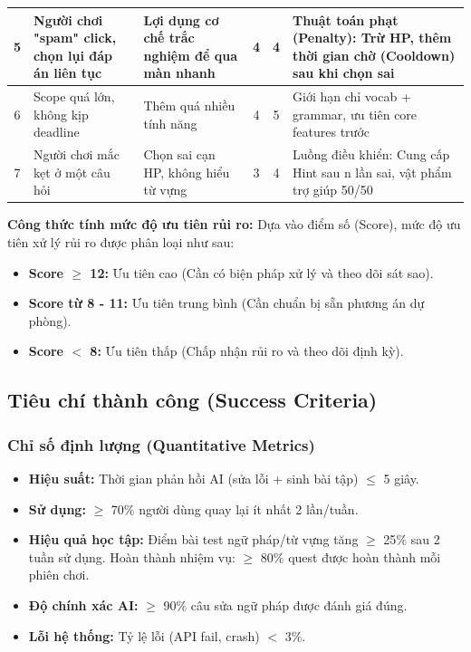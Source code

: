 \begin{xltabular}{\textwidth}{|S|P|P|C|C|P|}
    5 & Người chơi "spam" click, chọn lụi đáp án liên tục & Lợi dụng cơ chế trắc nghiệm để qua màn nhanh & 4 & 4 & Thuật toán phạt (Penalty): Trừ HP, thêm thời gian chờ (Cooldown) sau khi chọn sai \\ \hline
    
    6 & Scope quá lớn, không kịp deadline & Thêm quá nhiều tính năng & 4 & 5 & Giới hạn chỉ vocab + grammar, ưu tiên core features trước \\ \hline
    
    7 & Người chơi mắc kẹt ở một câu hỏi & Chọn sai cạn HP, không hiểu từ vựng & 3 & 4 & Luồng điều khiển: Cung cấp Hint sau n lần sai, vật phẩm trợ giúp 50/50 \\ \hline
    
\end{xltabular}
\textbf{Công thức tính mức độ ưu tiên rủi ro:}
Dựa vào điểm số (Score), mức độ ưu tiên xử lý rủi ro được phân loại như sau:
\begin{itemize}[label=$\bullet$]
    \item \textbf{Score $\geq$ 12:} Ưu tiên cao (Cần có biện pháp xử lý và theo dõi sát sao).
    \item \textbf{Score từ 8 - 11:} Ưu tiên trung bình (Cần chuẩn bị sẵn phương án dự phòng).
    \item \textbf{Score $<$ 8:} Ưu tiên thấp (Chấp nhận rủi ro và theo dõi định kỳ).
\end{itemize}
\subsection{Tiêu chí thành công (Success Criteria)}
\subsubsection{Chỉ số định lượng (Quantitative Metrics)}
\begin{itemize}[label=-]
\item \textbf{Hiệu suất:} Thời gian phản hồi AI (sửa lỗi + sinh bài tập) $\leq$ 5 giây.
\item \textbf{Sử dụng:} $\geq$ 70$\%$ người dùng quay lại ít nhất 2 lần/tuần.
\item \textbf{Hiệu quả học tập:} Điểm bài test ngữ pháp/từ vựng tăng $\geq$ 25$\%$ sau 2 tuần sử dụng.
Hoàn thành nhiệm vụ: $\geq$ 80$\%$ quest được hoàn thành mỗi phiên chơi.
\item \textbf{Độ chính xác AI:} $\geq$ 90$\%$ câu sửa ngữ pháp được đánh giá đúng.
\item \textbf{Lỗi hệ thống:} Tỷ lệ lỗi (API fail, crash) $<$ 3$\%$.
\end{itemize}

